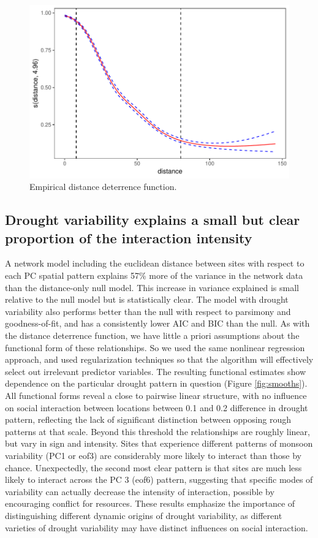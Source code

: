 \documentclass[fleqn,10pt]{wlscirep}
\begin{document}
\begin{figure}[!htbp]
\centering
\includegraphics[width=.8\linewidth]{figures/distance_function.pdf}
\caption{Empirical distance deterrence function.}
\label{fig:distance}
\end{figure}

\subsection*{Drought variability explains a small but clear proportion of the interaction intensity}
A network model including the euclidean distance between sites with respect to each PC spatial pattern explains 57\% more of the variance in the network data than the distance-only null model. This increase in variance explained is small relative to the null model but is statistically clear. The model with drought variability also performs better than the null with respect to parsimony and goodness-of-fit, and has a consistently lower AIC and BIC than the null. As with the distance deterrence function, we have little a priori assumptions about the functional form of these relationships. So we used the same nonlinear regression approach, and used regularization techniques so that the algorithm will effectively select out irrelevant predictor variables. The resulting functional estimates show dependence on the particular drought pattern in question (Figure \ref{fig:smooths}). All functional forms reveal a close to pairwise linear structure, with no influence on social interaction between locations between 0.1 and 0.2 difference in drought pattern, reflecting the lack of significant distinction between opposing rough patterns at that scale. Beyond this threshold the relationships are roughly linear, but vary in sign and intensity. Sites that experience different patterns of monsoon variability (PC1 or eof3) are considerably more likely to interact than those by chance. Unexpectedly, the second most clear pattern is that sites are much less likely to interact across the PC 3 (eof6) pattern, suggesting that specific modes of variability can actually decrease the intensity of interaction, possible by encouraging conflict for resources. These results emphasize the importance of distinguishing different dynamic origins of drought variability, as different varieties of drought variability may have distinct influences on social interaction.
\end{document}
